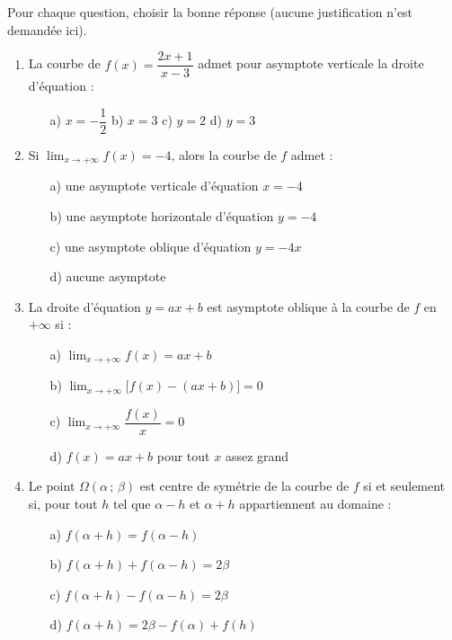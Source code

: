 \documentclass[11pt]{article}
\begin{document}
\begin{exercice}
Pour chaque question, choisir la bonne réponse (aucune justification n'est demandée ici).
\begin{enumerate}
\item La courbe de $f(x)=\dfrac{2x+1}{x-3}$ admet pour asymptote verticale la droite d'équation :
\begin{itemize}
\item[a)] $x=-\dfrac{1}{2}$ \qquad b) $x=3$ \qquad c) $y=2$ \qquad d) $y=3$
\end{itemize}
\item Si $\displaystyle\lim_{x\to +\infty}f(x)=-4$, alors la courbe de $f$ admet :
\begin{itemize}
\item[a)] une asymptote verticale d'équation $x=-4$
\item[b)] une asymptote horizontale d'équation $y=-4$
\item[c)] une asymptote oblique d'équation $y=-4x$
\item[d)] aucune asymptote
\end{itemize}
\item La droite d'équation $y=ax+b$ est asymptote oblique à la courbe de $f$ en $+\infty$ si :
\begin{itemize}
\item[a)] $\displaystyle\lim_{x\to +\infty}f(x)=ax+b$
\item[b)] $\displaystyle\lim_{x\to +\infty}\bigl[f(x)-(ax+b)\bigr]=0$
\item[c)] $\displaystyle\lim_{x\to +\infty}\dfrac{f(x)}{x}=0$
\item[d)] $f(x)=ax+b$ pour tout $x$ assez grand
\end{itemize}
\item Le point $\Omega(\alpha\,;\,\beta)$ est centre de symétrie de la courbe de $f$ si et seulement si, pour tout $h$ tel que $\alpha-h$ et $\alpha+h$ appartiennent au domaine :
\begin{itemize}
\item[a)] $f(\alpha+h)=f(\alpha-h)$
\item[b)] $f(\alpha+h)+f(\alpha-h)=2\beta$
\item[c)] $f(\alpha+h)-f(\alpha-h)=2\beta$
\item[d)] $f(\alpha+h)=2\beta-f(\alpha)+f(h)$
\end{itemize}
\end{enumerate}
\end{exercice}
\end{document}
